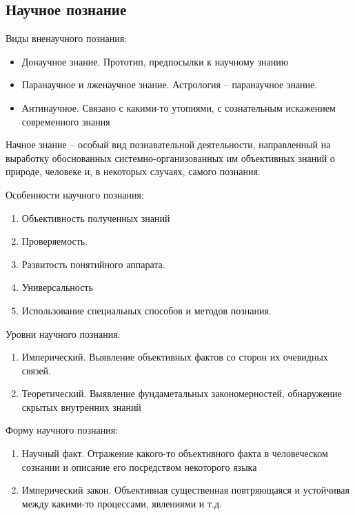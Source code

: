 \documentclass[12pt,a4paper]{book}
\begin{document}
\subsection{Научное познание}
Виды вненаучного познания:
\begin{itemize}
	\item Донаучное знание. Прототип, предпосылки к научному знанию
	\item Паранаучное и лженаучное знание. Астрология -- паранаучное знание.
	\item Антинаучное. Связано с какими-то утопиями, с сознательным искажением современного знания
\end{itemize}

Начное знание -- особый вид познавательной деятельности, направленный на выработку обоснованных системно-организованных им объективных знаний о природе, человеке и, в некоторых случаях, самого познания.

Особенности научного познания:
\begin{enumerate}
	\item Объективность полученных знаний
	\item Проверяемость.
	\item Развитость понятийного аппарата.
	\item Универсальность
	\item Использование специальных способов и методов познания.
\end{enumerate}

Уровни научного познания:
\begin{enumerate}
	\item Имперический. Выявление объективных фактов со сторон их очевидных связей. 
	\item Теоретический. Выявление фундаметальных закономерностей, обнаружение скрытых внутренних знаний
\end{enumerate}

Форму научного познания:
\begin{enumerate}
	\item Научный факт. Отражение какого-то объективного факта в человеческом сознании и описание его посредством некоторого языка
	\item Имперический закон. Объективная существенная повтряющаяся и устойчивая между какими-то процессами, явлениями и т.д.
\end{enumerate}
\end{document}
